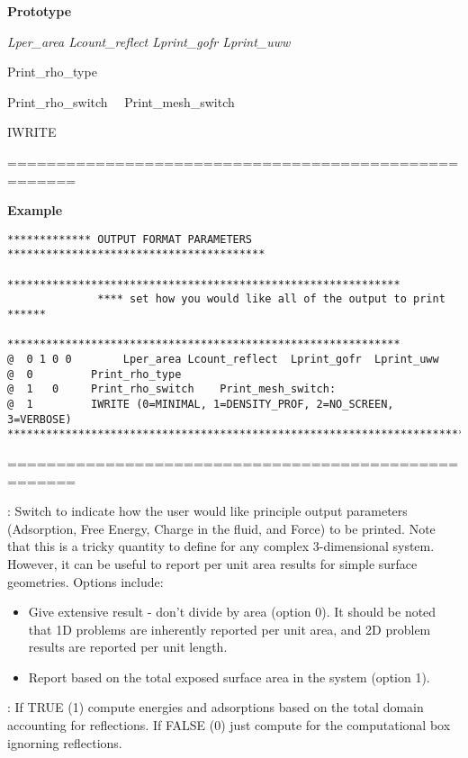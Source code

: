 \documentclass[10pt,onecolumn]{article}
\begin{document}
{\bf Prototype}

{\it Lper\_area  Lcount\_reflect  Lprint\_gofr   Lprint\_uww

Print\_rho\_type

Print\_rho\_switch \ \  Print\_mesh\_switch

IWRITE
}

\noindent=====================================================

{\bf Example}

\begin{verbatim}
************* OUTPUT FORMAT PARAMETERS ****************************************
              *************************************************************
              **** set how you would like all of the output to print ******
              *************************************************************
@  0 1 0 0        Lper_area Lcount_reflect  Lprint_gofr  Lprint_uww
@  0         Print_rho_type
@  1   0     Print_rho_switch    Print_mesh_switch:
@  1         IWRITE (0=MINIMAL, 1=DENSITY_PROF, 2=NO_SCREEN, 3=VERBOSE)
***********************************************************************
\end{verbatim}

\noindent=====================================================
\vspace{0.1in}


\vspace{0.1in}
:  Switch to indicate how the user would like principle
output parameters (Adsorption, Free Energy, Charge in the fluid, and Force) to
be printed.  Note that this is a tricky quantity to define for any complex
3-dimensional system.  However, it can be useful to report per unit area results
for simple surface geometries.  Options include:

\begin{itemize}
\item Give extensive result - don't divide by area (option 0).  It should
be noted that 1D problems are inherently reported per unit area, and 2D
problem results are reported per unit length.

\item Report based on the total exposed surface area in the system (option 1).
\end{itemize}

\vspace{0.1in}
: If TRUE (1) compute energies and adsorptions based
on the total domain accounting for reflections.  If FALSE (0) just compute for the 
computational box ignorning reflections.
\end{document}

